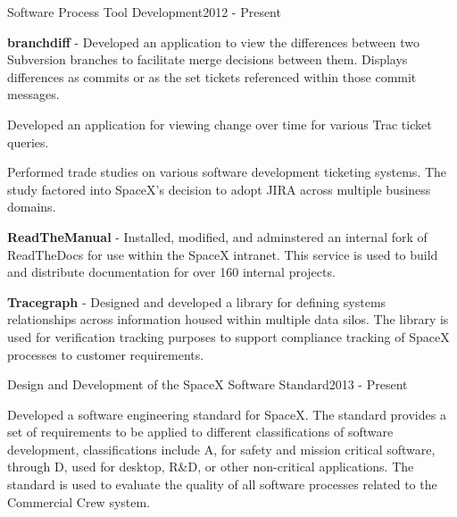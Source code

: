\begin{cventries}

  \cventry
  {Software Process Tool Development}{}{}{2012 - Present}
  {
    \begin{cvitems}
    \item \textbf{branchdiff} - Developed an application to view the differences
      between two Subversion branches to facilitate merge decisions
      between them. Displays differences as commits or as the set tickets
      referenced within those commit messages.
    \item Developed an application for viewing change over time for various Trac
      ticket queries.
    \item Performed trade studies on various software development
      ticketing systems. The study factored into SpaceX's decision to
      adopt JIRA across multiple business domains.
    \item \textbf{ReadTheManual} - Installed, modified, and adminstered an
      internal fork of ReadTheDocs for use within the SpaceX
      intranet. This service is used to build and distribute documentation
      for over 160 internal projects.
    \item \textbf{Tracegraph} - Designed and developed a library for
      defining systems relationships across information housed within
      multiple data silos. The library is used for verification tracking
      purposes to support compliance tracking of SpaceX processes to
      customer requirements.
    \end{cvitems}
  }


  \cventry
  {Design and Development of the SpaceX Software Standard}{}{}{2013 - Present}
  {
    \begin{cvitems}
    \item Developed a software engineering standard for SpaceX. The
      standard provides a set of requirements to be applied to different
      classifications of software development, classifications include A,
      for safety and mission critical software, through D, used for
      desktop, R\&D, or other non-critical applications. The standard is
      used to evaluate the quality of all software processes related to the
      Commercial Crew system.
    \end{cvitems}
  }



\end{cventries}
